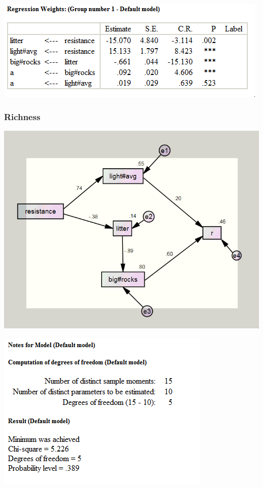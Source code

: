 \documentclass[a4paper]{article}
\begin{document}
\includegraphics[]{A_SEMreg.png}

\subsubsection{Richness}

\includegraphics[]{R_SEMpathdia.png}

\includegraphics[]{R_SEMnotes.png}
\end{document}
